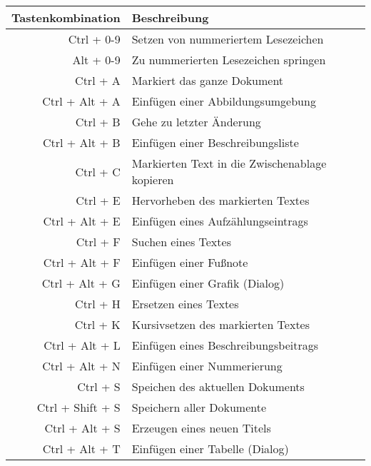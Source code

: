 \begin{table}
	\begin{center}
	\begin{tabular}{rl}
		\textbf{Tastenkombination} & \textbf{Beschreibung} \\ \hline
		
		Ctrl + 0-9 & Setzen von nummeriertem Lesezeichen \\
		Alt + 0-9 & Zu nummerierten Lesezeichen springen \\
		
		Ctrl + A & Markiert das ganze Dokument \\
		Ctrl + Alt + A & Einfügen einer Abbildungsumgebung \\
		
		Ctrl + B & Gehe zu letzter Änderung \\
		Ctrl + Alt + B & Einfügen einer Beschreibungsliste \\
		
		
		Ctrl + C & Markierten Text in die Zwischenablage kopieren \\
		
		
		Ctrl + E & Hervorheben des markierten Textes \\
		Ctrl + Alt + E & Einfügen eines Aufzählungseintrags \\
		
		Ctrl + F & Suchen eines Textes \\
		Ctrl + Alt + F & Einfügen einer Fußnote \\
		
		Ctrl + Alt + G & Einfügen einer Grafik (Dialog) \\
		
		Ctrl + H & Ersetzen eines Textes \\
		
		Ctrl + K & Kursivsetzen des markierten Textes \\
	
		Ctrl + Alt + L & Einfügen eines Beschreibungsbeitrags \\
	
		Ctrl + Alt + N & Einfügen einer Nummerierung \\
		
	
		Ctrl + S & Speichen des aktuellen Dokuments \\
		Ctrl + Shift + S & Speichern aller Dokumente \\
		Ctrl + Alt + S & Erzeugen eines neuen Titels \\
		
		Ctrl + Alt + T & Einfügen einer Tabelle (Dialog) \\
		

\end{tabular}
\end{center}
\end{table}
